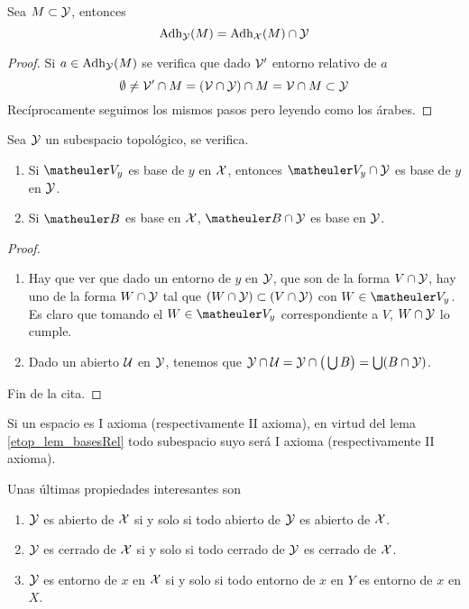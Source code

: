 \begin{prop}
	Sea $M \subset \mathcal{Y}$, entonces \[\operatorname{\mathrm{Adh}}_{\mathcal{Y}}(M)=\operatorname{\mathrm{Adh}}_{\mathcal{X}}(M)\cap\mathcal{Y}\]
\end{prop}
\begin{proof}
	Si $a \in \operatorname{\mathrm{Adh}}_{\mathcal{Y}}(M)$ se verifica que dado $\mathcal{V}'$ entorno relativo de $a$
	\[\emptyset\not=\mathcal{V}' \cap M = (\mathcal{V}\cap\mathcal{Y})\cap M = \mathcal{V} \cap M\subset\mathcal{Y}\]
	Recíprocamente seguimos los mismos pasos pero leyendo como los árabes.
\end{proof}
\begin{lem}
	\label{etop_lem_basesRel}
	Sea $\mathcal{Y}$ un subespacio topológico, se verifica.
	\begin{enumerate}
		\item Si $\Va{y}$ es base de $y$ en $\mathcal{X}$, entonces $\Va{y} \cap \Y$ es base de $y$ en $\mathcal{Y}$.
		\item Si $\B$ es base en $\mathcal{X}$, $\B \cap \Y$ es base en $\mathcal{Y}$.
	\end{enumerate}
\end{lem}
\begin{proof}
	\begin{enumerate}
		\item Hay que ver que dado un entorno de $y$ en $\mathcal{Y}$, que son de la forma $V \cap \mathcal{Y}$, hay uno de la forma $W \cap \mathcal{Y}$ tal que $(W \cap \mathcal{Y}) \subset (V \cap \mathcal{Y})$ con $W\in\Va{y}$. Es claro que tomando el $W\in\Va{y}$ correspondiente a $V$, $W \cap \mathcal{Y}$ lo cumple.
		\item Dado un abierto $\mathcal{U}$ en $\mathcal{Y}$, tenemos que $\mathcal{Y} \cap \mathcal{U} = \mathcal{Y} \cap \big( \bigcup B \big) = \bigcup (B \cap \mathcal{Y})$.
	\end{enumerate}
	Fin de la cita.
\end{proof}
\begin{obs}
	\label{etop_obs_axiomasHereditarios}
	Si un espacio es I axioma (respectivamente II axioma), en virtud del lema \ref{etop_lem_basesRel} todo subespacio suyo será I axioma (respectivamente II axioma).
\end{obs}
\begin{lem}
	\label{etop_lem_abierto_en_abierto_relativa}
	Unas últimas propiedades interesantes son
	\begin{enumerate}
		\item $\mathcal{Y}$ es abierto de $\mathcal{X}$ si y solo si todo abierto de $\mathcal{Y}$ es abierto de $\mathcal{X}$.
		\item $\mathcal{Y}$ es cerrado de $\mathcal{X}$ si y solo si todo cerrado de $\mathcal{Y}$ es cerrado de $\mathcal{X}$.
		\item $\mathcal{Y}$ es entorno de $x$ en $\mathcal{X}$ si y solo si todo entorno de $x$ en $Y$ es entorno de $x$ en $X$.
	\end{enumerate}
\end{lem}
